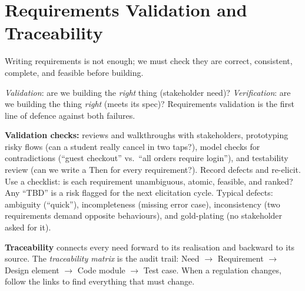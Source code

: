 \section{Requirements Validation and Traceability}
\label{sec:validation}
Writing requirements is not enough; we must check they are correct, consistent, complete, and feasible before building.

\begin{definition} \emph{Validation}: are we building the \emph{right} thing (stakeholder need)? \emph{Verification}: are we building the thing \emph{right} (meets its spec)? Requirements validation is the first line of defence against both failures.\end{definition}
\textbf{Validation checks:} reviews and walkthroughs with stakeholders, prototyping risky flows (can a student really cancel in two taps?), model checks for contradictions (``guest checkout'' vs.\ ``all orders require login''), and testability review (can we write a Then for every requirement?). Record defects and re-elicit. Use a checklist: is each requirement unambiguous, atomic, feasible, and ranked? Any ``TBD'' is a risk flagged for the next elicitation cycle.
Typical defects: ambiguity (``quick''), incompleteness (missing error case), inconsistency (two requirements demand opposite behaviours), and gold-plating (no stakeholder asked for it).

\textbf{Traceability} connects every need forward to its realisation and backward to its source. The \emph{traceability matrix} is the audit trail: Need $\to$ Requirement $\to$ Design element $\to$ Code module $\to$ Test case. When a regulation changes, follow the links to find everything that must change.

